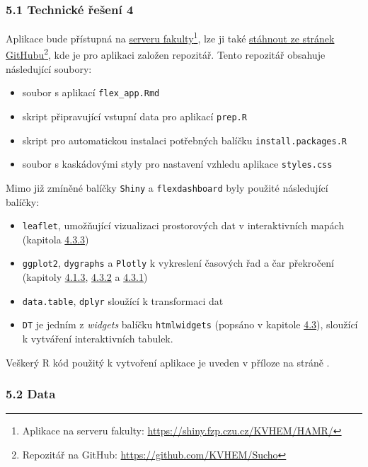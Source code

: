 \documentclass[12pt,]{article}
\providecommand{\tightlist}{%
  \setlength{\itemsep}{0pt}\setlength{\parskip}{0pt}}
\let\rmarkdownfootnote\footnote%
\def\footnote{\protect\rmarkdownfootnote}
\begin{document}
\hypertarget{techres}{\subsubsection{5.1 Technické řešení
4}\label{techres}}

Aplikace bude přístupná na
\href{https://shiny.fzp.czu.cz/KVHEM/HAMR/}{serveru fakulty}\footnote{Aplikace
  na serveru fakulty: \url{https://shiny.fzp.czu.cz/KVHEM/HAMR/}}, lze
ji také \href{https://github.com/KVHEM/Sucho}{stáhnout ze stránek
GitHubu}\footnote{Repozitář na GitHub:
  \url{https://github.com/KVHEM/Sucho}}, kde je pro aplikaci založen
repozitář. Tento repozitář obsahuje následující soubory:

\begin{itemize}
\tightlist
\item
  soubor s aplikací \texttt{flex\_app.Rmd}
\item
  skript připravující vstupní data pro aplikací \texttt{prep.R}
\item
  skript pro automatickou instalaci potřebných balíčku
  \texttt{install.packages.R}
\item
  soubor s kaskádovými styly pro nastavení vzhledu aplikace
  \texttt{styles.css}
\end{itemize}

Mimo již zmíněné balíčky \texttt{Shiny} a \texttt{flexdashboard} byly
použité následující balíčky:

\begin{itemize}
\tightlist
\item
  \texttt{leaflet}, umožňující vizualizaci prostorových dat v
  interaktivních mapách (kapitola \protect\hyperlink{leaflet}{4.3.3})
\item
  \texttt{ggplot2}, \texttt{dygraphs} a \texttt{Plotly} k vykreslení
  časových řad a čar překročení (kapitoly
  \protect\hyperlink{ggplot}{4.1.3}, \protect\hyperlink{dygraphs}{4.3.2}
  a \protect\hyperlink{plotly}{4.3.1})
\item
  \texttt{data.table}, \texttt{dplyr} sloužící k transformaci dat
\item
  \texttt{DT} je jedním z \emph{widgets} balíčku \texttt{htmlwidgets}
  (popsáno v kapitole \protect\hyperlink{htmlwidgets}{4.3}), sloužící k
  vytváření interaktivních tabulek.
\end{itemize}

Veškerý R kód použitý k vytvoření aplikace je uveden v příloze na stráně
\pageref{prilohy}.

\hypertarget{data}{\subsubsection{5.2 Data}\label{data}}
\end{document}
